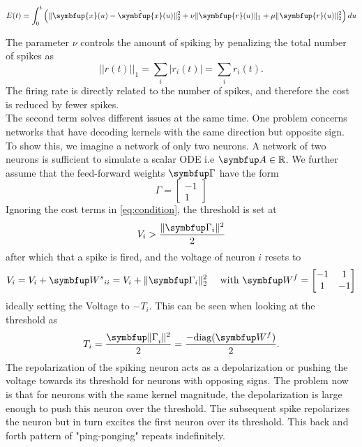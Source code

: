 \begin{equation}\label{eq:cost_func}
E(t)=\int_0^t \left(\|\symbfup{x}(u)-\hat{\symbfup{x}}(u)\|_2^2+\nu\|\symbfup{r}(u)\|_1+\mu\|\symbfup{r}(u)\|_2^2\right)d u
\end{equation}

The parameter $\nu$ controls the amount of spiking by penalizing the total number of spikes as
\begin{equation}
||r(t)||_1 = \sum_i|r_i(t)| = \sum_i r_i(t).
\end{equation}
The firing rate is directly related to the number of spikes, and therefore the cost is reduced by fewer spikes.\\

The second term solves different issues at the same time. One problem concerns networks that have decoding kernels with the same direction but opposite sign. To show this, we imagine a network of only two neurons. A network of two neurons is sufficient to simulate a scalar \ac{ODE} i.e $\bmu{A}\in \mathbb{R}$. We further assume that the feed-forward weights $\bmu{\Gamma}$ have the form
\begin{equation}
\Gamma = \begin{bmatrix}
-1\\1
\end{bmatrix}
\end{equation}
Ignoring the cost terms in \cref{eq:condition}, the threshold is set at
\begin{equation}
V_i > \frac{\|\bmu{\Gamma}_i\|^2}{2}
\end{equation}
after which that a spike is fired, and the voltage of neuron $i$  resets to
\begin{equation}
V_i = V_i + \bmu{W^s}_{ii} = V_i + \|\bmu{\Gamma}_i\|^2_2 \quad \text{ with } \bmu{W^f} = \begin{bmatrix}
-1& 1\\
1& -1
\end{bmatrix}
\end{equation}
ideally setting the Voltage to $-T_i$. This can be seen when looking at the threshold as
\begin{equation}
T_i =\frac{ \bmu{\|\Gamma}_i\|^2}{2}= \frac{-\text{diag}(\bmu{W^f})}{2}.
\end{equation}
The repolarization of the spiking neuron acts as a depolarization or pushing the voltage towards its threshold for neurons with opposing signs. The problem now is that for neurons with the same kernel magnitude, the depolarization is large enough to push this neuron over the threshold. The subsequent spike repolarizes the neuron but in turn excites the first neuron over its threshold. This back and forth pattern of "ping-ponging" repeats indefinitely.\\
